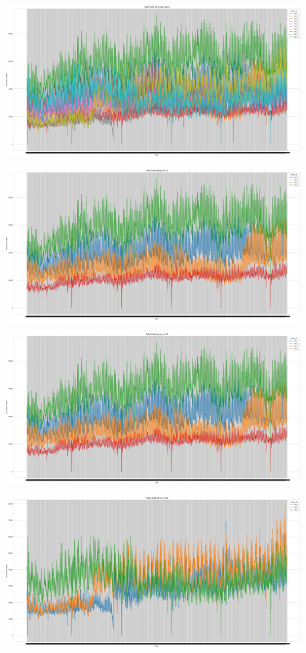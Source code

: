 \documentclass[fleqn,10pt]{SelfArx} %
\begin{document}
\includegraphics[scale=0.1]{35.png}

\includegraphics[scale=0.1]{36.png}

\includegraphics[scale=0.1]{37.png}

\includegraphics[scale=0.1]{38.png}
\end{document}
